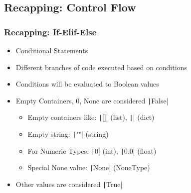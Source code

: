 \documentclass{beamer}
\newcommand{\python}[1]{\texttt|#1|}
\begin{document}
\subsection{Recapping: Control Flow}
\begin{frame}[fragile]
    \frametitle{Recapping: If-Elif-Else}
    \begin{itemize}
        \item Conditional Statements
        \item Different branches of code executed based on conditions
        \item Conditions will be evaluated to Boolean values
        \item Empty Containers, 0, None are considered \python{False}
              \begin{itemize}
                  \item Empty containers like: \python{[]} (list), \python{{}} (dict)
                  \item Empty string: \python{""} (string)
                  \item For Numeric Types: \python{0} (int), \python{0.0} (float)
                  \item Special None value: \python{None} (NoneType)
              \end{itemize}
        \item Other values are considered \python{True}
    \end{itemize}
\end{frame}
\end{document}

